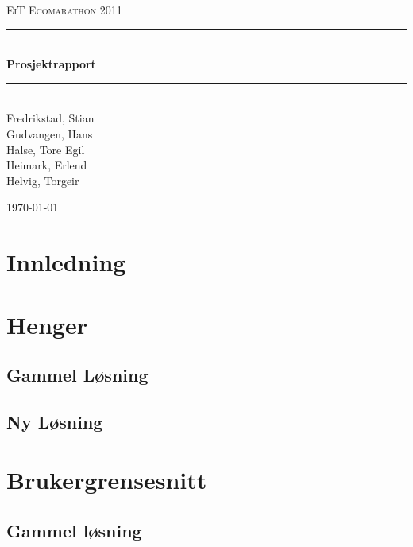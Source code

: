 \documentclass[a4paper,11pt]{report}
\newcommand{\HRule}{\rule{\linewidth}{0.5mm}}
\begin{document}
\begin{titlepage}

\begin{center}
\textsc{\LARGE EiT Ecomarathon 2011}\\[1.5cm]

\HRule \\[0.4cm]
{ \huge \bfseries Prosjektrapport}\\[0.4cm]
\HRule \\[1.5cm] 

Fredrikstad, Stian\\
Gudvangen, Hans\\
Halse, Tore Egil\\
Heimark, Erlend\\
Helvig, Torgeir\\

\vfill
 
{\large \today}

\end{center}
\end{titlepage}
\cleardoublepage
{}
\tableofcontents
\listoffigures
\listoftables
\clearpage

\chapter{Innledning}

\chapter{Henger}
\section{Gammel Løsning}

\section{Ny Løsning}


\newpage





\chapter{Brukergrensesnitt}
\section{Gammel løsning}

\newpage
\end{document}
